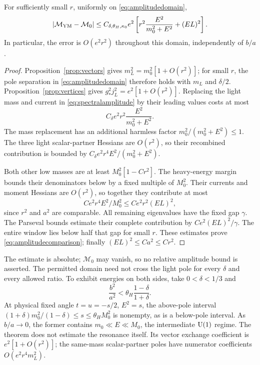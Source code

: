 \begin{theorem}\label{thm:amplitude}
For sufficiently small $r$, uniformly on \eqref{eq:amplitudedomain},
\begin{equation}\label{eq:amplitudecomparison}
 |\mathcal M_{\rm YM}-\mathcal M_0|
 \le C_{\delta,\theta_H,\kappa_0}e^2
       \left[r^2\frac{E^2}{m_0^2+E^2}+(EL)^2\right].
\end{equation}
In particular, the error is $O(e^2r^2)$ throughout this domain,
independently of $b/a$.
\end{theorem}
\begin{proof}
Proposition~\ref{prop:vectors} gives $m_L^2=m_0^2[1+O(r^2)]$;
for small $r$, the pole separation in \eqref{eq:amplitudedomain}
therefore holds with $m_L$ and $\delta/2$.
Proposition~\ref{prop:vertices} gives
$g_*^2j_L^2=e^2[1+O(r^2)]$. Replacing the light mass and current in
\eqref{eq:spectralamplitude} by their leading values costs at most
\[
 C_\delta e^2r^2\frac{E^2}{m_0^2+E^2}.
\]
The mass replacement has an additional harmless factor
$m_0^2/(m_0^2+E^2)\le1$. The three light scalar-partner Hessians
are $O(r^2)$, so their recombined contribution is bounded by
$C_\delta e^2r^4E^2/(m_0^2+E^2)$.

Both other low masses are at least $M_0^2[1-Cr^2]$. The heavy-energy
margin bounds their denominators below by a fixed multiple of $M_0^2$.
Their currents and moment Hessians are $O(r^2)$, so together they
contribute at most
\[
 Ce^2r^4E^2/M_0^2\le Ce^2r^2(EL)^2,
\]
since $r^2$ and $a^2$ are comparable. All remaining eigenvalues have
the fixed gap $\gamma$. The Parseval bounds estimate their complete
contribution by $Ce^2(EL)^2/\gamma$. The entire window lies below
half that gap for small $r$. These estimates prove
\eqref{eq:amplitudecomparison}; finally $(EL)^2\le Ca^2\le Cr^2$.
\end{proof}

The estimate is absolute; $\mathcal M_0$ may vanish, so no relative
amplitude bound is asserted. The permitted domain need not cross the
light pole for every $\delta$ and every allowed ratio. To exhibit
energies on both sides, take $0<\delta<1/3$ and
\begin{equation}\label{eq:crossingdomain}
 \frac{b^2}{a^2}<\theta_H\frac{1-\delta}{1+\delta}.
\end{equation}
At physical fixed angle $t=u=-s/2$, $E^2=s$, the above-pole interval
$(1+\delta)m_0^2/(1-\delta)\le s\le\theta_HM_0^2$ is nonempty,
as is a below-pole interval. As $b/a\to0$, the former contains
$m_0\ll E\ll M_0$, the intermediate $\operatorname{U}(1)$ regime. The theorem
does not estimate the resonance itself. Its vector exchange coefficient
is $e^2[1+O(r^2)]$; the same-mass scalar-partner poles have numerator
coefficients $O(e^2r^4m_L^2)$.

